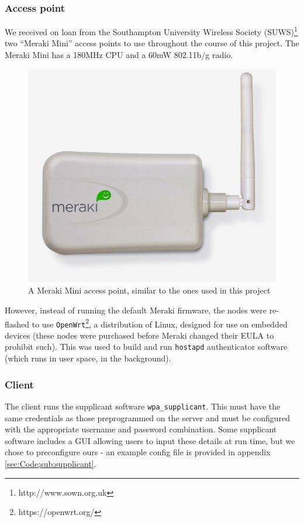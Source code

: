 \documentclass[12pt,a4paper,titlepage]{article}
\begin{document}
\subsubsection{Access point}
\label{sec:implementation;sub:components;sub:accesspoint}
We received on loan from the Southampton University Wireless Society (SUWS)\footnote{http://www.sown.org.uk} two ``Meraki Mini'' access points to use throughout the course of this project. The Meraki Mini has a 180MHz CPU and a 60mW 802.11b/g radio.
\begin{figure}[h!]
\centering
\includegraphics[scale=0.3]{./images/meraki-mini.jpg}
\caption{A Meraki Mini access point, similar to the ones used in this project \cite{imagemeraki}}
\end{figure}

However, instead of running the default Meraki firmware, the nodes were re-flashed to use \texttt{OpenWrt}\footnote{https://openwrt.org/}, a distribution of Linux, designed for use on embedded devices (these nodes were purchased before Meraki changed their EULA to prohibit such). This was used to build and run \texttt{hostapd} authenticator software (which runs in user space, in the background).

\subsubsection{Client}
\label{sec:implementation;sub:components;sub:client}
The client runs the supplicant software \texttt{wpa\_supplicant}. This must have the same credentials as those preprogrammed on the server and must be configured with the appropriate username and password combination. Some supplicant software includes a GUI allowing users to input these details at run time, but we chose to preconfigure ours - an example config file is provided in appendix \ref{sec:Code;sub:supplicant}.
\end{document}
